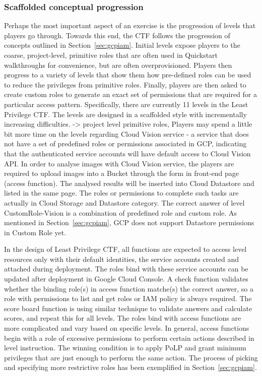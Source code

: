 \subsubsection{Scaffolded conceptual progression}
Perhaps the most important aspect of an exercise is the progression of levels that players go through.  Towards this end, the CTF follows the progression
of concepts outlined in Section~\ref{sec:gcpiam}.  Initial levels expose players to the coarse, project-level, primitive roles that are often used in Quickstart
walkthroughs for convenience, but are often overprovisioned.  Players then progress to a variety of levels that show them how pre-defined roles can be used
to reduce the privileges from primitive roles.   Finally, players are then asked to create custom roles to generate an exact set of permissions that are
required for a particular access pattern.
Specifically, there are currently 11 levels in the Least Privilege CTF.  The levels are designed in a scaffolded style with incrementally increasing difficulties. 
-> project level primitive roles, 
Players may spend a little bit more time on the levels regarding Cloud Vision service - a service that does not have a set of predefined roles or permissions associated in GCP, indicating that the authenticated service accounts will have default access to Cloud Vision API. In order to analyse images with Cloud Vision service, the players are required to upload images into a Bucket through the form in front-end page (access function). The analysed results will be inserted into Cloud Datastore and listed in the same page.  The roles or permissions to complete such tasks are actually in Cloud Storage and Datastore category. The correct answer of level CustomRole-Vision is a combination of predefined role and custom role. As mentioned in Section~\ref{sec:gcpiam}, GCP does not support Datastore permissions in Custom Role yet.


In the design of Least Privilege CTF, all functions are expected to access level resources only with their default identities, the service accounts created and attached during deployment. The roles bind with these service accounts can be updated after deployment in Google Cloud Console. 
A check function validates whether the binding role(s) in access function matche(s) the correct answer, so a role with permissions to list and get roles or IAM policy is always required. The score board function is using similar technique to validate answers and calculate scores, and repeat this for all levels. The roles bind with access functions are more complicated and vary based on specific levels. In general, access functions begin with a role of excessive permissions to perform certain actions described in level instruction. The winning condition is to apply PoLP and grant minimum privileges that are just enough to perform the same action. The process of picking and specifying more restrictive roles has been exemplified in Section~\ref{sec:gcpiam}.

